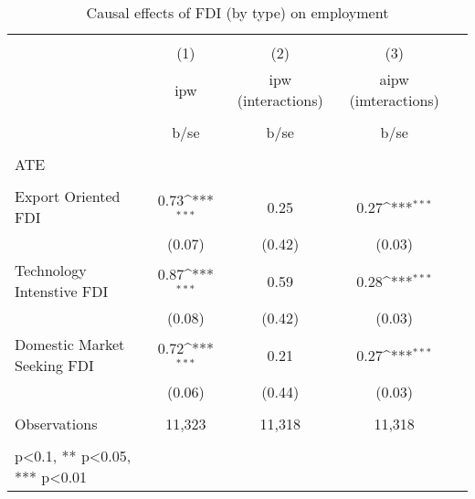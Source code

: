 \documentclass[11pt,a4paper,leqno]{article}
\begin{document}
\begin{table}
	\def\sym#1{\ifmmode^{#1}\else\(^{#1}\)\fi}
	\caption{Causal effects of FDI (by type) on employment}
\begin{tabular}{l*{1}{cccc}}
	\hline\hline
	&\multicolumn{4}{c}{}                                        \\
	& (1) & (2) & (3)    \\
	\
	&ipw & ipw (interactions) & aipw (imteractions)    \\
	\\
	&b/se&b/se& b/se       \\
	\hline
	\\
	ATE \\
	\\
	Export Oriented FDI &       0.73\sym{***} &  0.25  &   0.27\sym{***} \\
	&     (0.07)&     (0.42)&   (0.03)        \\
	Technology Intenstive FDI&       0.87\sym{***}&       0.59 &       0.28\sym{***}\\
	&     (0.08)&     (0.42)& (0.03)          \\
	Domestic Market Seeking FDI&       0.72\sym{***}&       0.21 &      0.27\sym{***}\\
	&     (0.06)&     (0.44)&     (0.03)   \\
	\hline
	\\
	Observations        &       11,323 &      11,318      &   11,318                  &            \\
	\hline\hline
	\\
	\small * p<0.1, ** p<0.05, *** p<0.01
\end{tabular} \\
\end{table}
\end{document}
